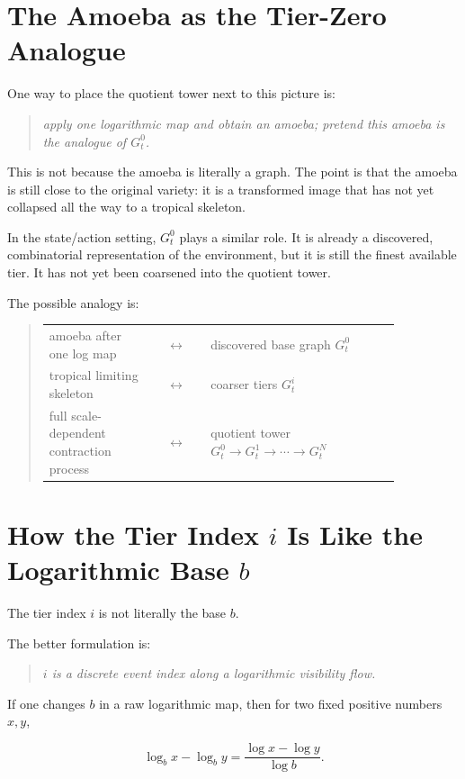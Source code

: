 \documentclass[11pt]{article}
\makeatletter
\newenvironment{claimbox}
  {\begin{quote}\itshape}
  {\end{quote}}
\newenvironment{dictionary}
  {\begin{quote}\begin{tabular}{@{}p{0.30\linewidth}c p{0.54\linewidth}@{}}}
  {\end{tabular}\end{quote}}
\makeatother
\begin{document}
\section{The Amoeba as the Tier-Zero Analogue}

One way to place the quotient tower next to this picture is:

\begin{claimbox}
apply one logarithmic map and obtain an amoeba; pretend this amoeba is the
analogue of \(G_t^0\).
\end{claimbox}

This is not because the amoeba is literally a graph. The point is that the
amoeba is still close to the original variety: it is a transformed image that
has not yet collapsed all the way to a tropical skeleton.

In the state/action setting, \(G_t^0\) plays a similar role. It is already a
discovered, combinatorial representation of the environment, but it is still
the finest available tier. It has not yet been coarsened into the quotient
tower.

The possible analogy is:

\begin{dictionary}
amoeba after one log map
  & \(\longleftrightarrow\) &
discovered base graph \(G_t^0\) \\
tropical limiting skeleton
  & \(\longleftrightarrow\) &
coarser tiers \(G_t^i\) \\
full scale-dependent contraction process
  & \(\longleftrightarrow\) &
quotient tower \(G_t^0\to G_t^1\to\cdots\to G_t^N\)
\end{dictionary}

\section{How the Tier Index \texorpdfstring{\(i\)}{i} Is Like the Logarithmic Base \texorpdfstring{\(b\)}{b}}

The tier index \(i\) is not literally the base \(b\).

The better formulation is:

\begin{claimbox}
\(i\) is a discrete event index along a logarithmic visibility flow.
\end{claimbox}

If one changes \(b\) in a raw logarithmic map, then for two fixed positive
numbers \(x,y\),

\[
\log_b x-\log_b y
=
\frac{\log x-\log y}{\log b}.
\]
\end{document}
